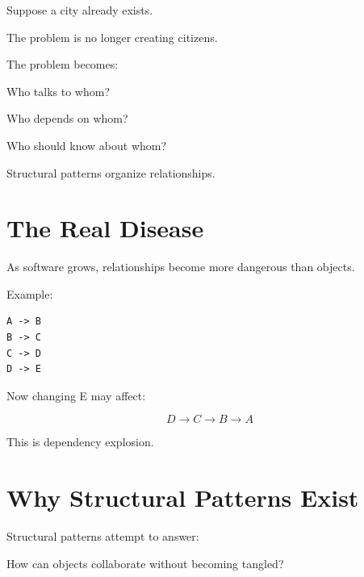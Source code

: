 \documentclass[11pt,a4paper]{book}
\begin{document}
\begin{mentalmodel}

Suppose a city already exists.

The problem is no longer creating citizens.

The problem becomes:

Who talks to whom?

Who depends on whom?

Who should know about whom?

\end{mentalmodel}

\begin{rosettarule}

Structural patterns organize relationships.

\end{rosettarule}

\section{The Real Disease}

\begin{idea}

As software grows,
relationships become more dangerous than objects.

\end{idea}

Example:

\begin{verbatim}
A -> B
B -> C
C -> D
D -> E
\end{verbatim}

Now changing E may affect:

\[
D
\rightarrow
C
\rightarrow
B
\rightarrow
A
\]

This is dependency explosion.


\section{Why Structural Patterns Exist}

\begin{idea}

Structural patterns attempt to answer:

\begin{center}
How can objects collaborate without becoming tangled?
\end{center}

\end{idea}
\end{document}
